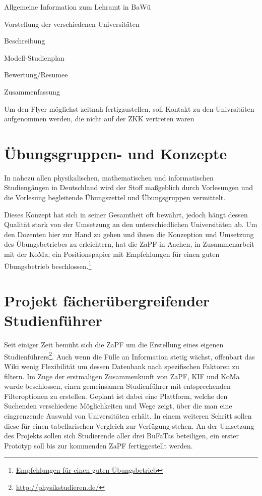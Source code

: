 \begin{compactenum}
    \item Allgemeine Information zum Lehramt in BaWü
    \item Vorstellung der verschiedenen Universitäten
        \begin{compactenum}
        \item Beschreibung
        \item Modell-Studienplan
        \item Bewertung/Resumee
        \end{compactenum}
    \item Zusammenfassung
\end{compactenum}

Um den Flyer möglichst zeitnah fertigzustellen, soll Kontakt zu den Univrsitäten aufgenommen werden, die nicht auf der ZKK vertreten waren

\newpage
\section*{Übungsgruppen- und Konzepte}
In nahezu allen physikalischen, mathematischen und informatischen Studiengängen
in Deutschland wird der Stoff maßgeblich durch Vorlesungen und die Vorlesung
begleitende Übungszettel und Übungsgruppen vermittelt.

Dieses Konzept hat sich in seiner Gesamtheit oft bewährt, jedoch hängt dessen Qualität stark von der Umsetzung an den unterschiedlichen Universitäten ab. Um den Dozenten hier zur Hand zu gehen und ihnen die Konzeption und
Umsetzung des Übungsbetriebes zu erleichtern, hat die ZaPF in Aachen, in
Zusammenarbeit mit der KoMa, ein Positionspapier mit Empfehlungen
für einen guten Übungsbetrieb beschlossen.\footnote{\href{https://vmp.ethz.ch/zapfwiki/images/0/03/Positionspapier\_SoSe15\_Uebungskonzepte.pdf}{Empfehlungen für einen guten Übungsbetrieb}}

\section*{Projekt fächerübergreifender Studienführer }

Seit einiger Zeit bemüht sich die ZaPF um die Erstellung eines eigenen
Studienführers\footnote{\href{http://physikstudieren.de/}{\url{http://physikstudieren.de/}}}.
Auch wenn die Fülle an Information stetig wächst, offenbart das Wiki wenig
Flexibilität um dessen Datenbank nach spezifischen Faktoren zu filtern. Im
Zuge der erstmaligen Zusammenkunft von ZaPF, KIF und KoMa wurde beschlossen, einen gemeinsamen Studienführer mit entsprechenden
Filteroptionen zu erstellen. Geplant ist dabei eine Plattform, welche den
Suchenden verschiedene Möglichkeiten und Wege zeigt, über die man eine
eingrenzende Auswahl von Universitäten erhält. In einem weiteren Schritt sollen
diese für einen tabellarischen Vergleich zur Verfügung stehen.  An der
Umsetzung des Projekts sollen sich Studierende aller drei BuFaTas beteiligen, ein
erster Prototyp soll bis zur kommenden ZaPF fertiggestellt werden.


